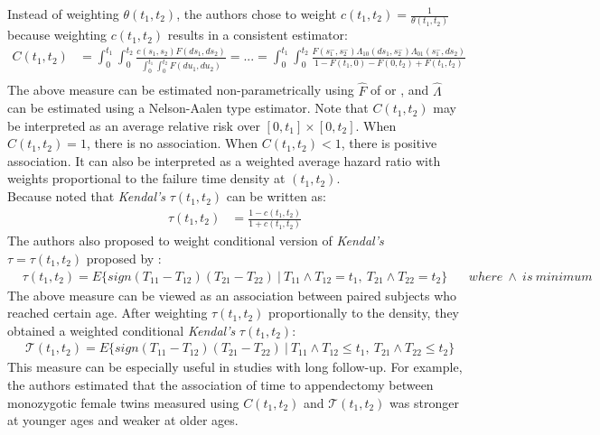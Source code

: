\documentclass[]{article}
\begin{document}
Instead of weighting $\theta(t_1, t_2)$, the authors chose to weight $c(t_1, t_2) = \frac{1}{\theta(t_1, t_2)}$ because weighting $c(t_1, t_2)$ results in a consistent estimator:
	$$
	\begin{aligned}
		C(t_1, t_2) &= \int_0^{t_1}\int_0^{t_2} \frac{c(s_1, s_2)F(ds_1,ds_2)}{\int_0^{t_1}\int_0^{t_2} F(du_1, du_2)} = ...= \int_0^{t_1}\int_0^{t_2} \frac{F(s_1^-, s_2^-)\Lambda_{10}(ds_1, s^-_2)\Lambda_{01}(s^-_1, ds_2)}{1 - F(t_1, 0) - F(0, t_2)+ F(t_1, t_2)} \\
	\end{aligned}
	$$
	The above measure can be estimated non-parametrically using $\hat{F}$ of \cite{dabrowska1988kaplan} or \cite{prentice1992covariance}, and $\hat{\Lambda}$ can be estimated using a Nelson-Aalen type estimator.
Note that $C(t_1, t_2)$ may be interpreted as an average relative risk over $[0,t_1] \times [0, t_2]$. When $C(t_1, t_2)=1$, there is no association. When $C(t_1, t_2)<1$, there is positive association. It can also be interpreted as a weighted average hazard ratio with weights proportional to the failure time density at $(t_1,t_2)$.\\
Because \cite{oakes1989bivariate} noted that \emph{Kendal's} $\tau(t_1, t_2)$ can be written as:
	$$
	\begin{aligned}
		\tau(t_1, t_2) &= \frac{1 - c(t_1, t_2)}{1+c(t_1, t_2)}
	\end{aligned}
	$$
	The authors also proposed to weight conditional version of \emph{Kendal's} $\tau=\tau(t_1, t_2)$ proposed by \cite{oakes1989bivariate}:
	$$
	\begin{aligned}
		&\tau(t_1, t_2) = E\{sign(T_{11} - T_{12}) (T_{21} - T_{22})~|~ T_{11}\wedge T_{12} = t_1,~T_{21}\wedge T_{22} = t_2  \}
		&~~~~where~\wedge~is~minimum
	\end{aligned}
	$$
The above measure can be viewed as an association between paired subjects who reached certain age. After weighting $\tau(t_1, t_2)$ proportionally to the density, they obtained a weighted conditional \emph{Kendal's} $\tau(t_1, t_2)$:
	$$
	\begin{aligned}
		&\mathcal{T}(t_1, t_2) = E\{sign(T_{11} - T_{12}) (T_{21} - T_{22})~|~ T_{11}\wedge T_{12} \leq t_1,~T_{21}\wedge T_{22} \leq t_2  \}
	\end{aligned}
	$$
This measure can be especially useful in studies with long follow-up. For example, the authors estimated that the association of time to appendectomy between monozygotic female twins measured using $C(t_1, t_2)$ and $\mathcal{T}(t_1, t_2)$ was stronger at younger ages and weaker at older ages.\\
\end{document}
